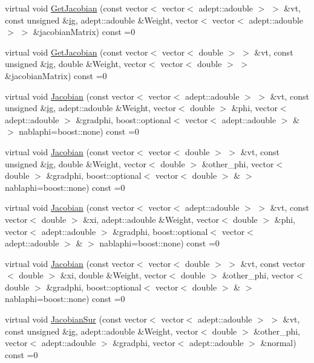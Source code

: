 \begin{DoxyCompactItemize}
\item 
virtual void \mbox{\hyperlink{classfemus_1_1elem__type_aa8e617c54dd774ffca5d305605552af7}{Get\+Jacobian}} (const vector$<$ vector$<$ adept\+::adouble $>$ $>$ \&vt, const unsigned \&\mbox{\hyperlink{namespacefemus_a6df31099f676311de214a312d7043941}{ig}}, adept\+::adouble \&Weight, vector$<$ vector$<$ adept\+::adouble $>$ $>$ \&jacobian\+Matrix) const =0
\item 
virtual void \mbox{\hyperlink{classfemus_1_1elem__type_a6c883b7946e55db8783fd0177546610a}{Get\+Jacobian}} (const vector$<$ vector$<$ double $>$ $>$ \&vt, const unsigned \&\mbox{\hyperlink{namespacefemus_a6df31099f676311de214a312d7043941}{ig}}, double \&Weight, vector$<$ vector$<$ double $>$ $>$ \&jacobian\+Matrix) const =0
\item 
virtual void \mbox{\hyperlink{classfemus_1_1elem__type_a937b1d5ecbeed3b17db831264a3492fa}{Jacobian}} (const vector$<$ vector$<$ adept\+::adouble $>$ $>$ \&vt, const unsigned \&\mbox{\hyperlink{namespacefemus_a6df31099f676311de214a312d7043941}{ig}}, adept\+::adouble \&Weight, vector$<$ double $>$ \&phi, vector$<$ adept\+::adouble $>$ \&gradphi, boost\+::optional$<$ vector$<$ adept\+::adouble $>$ \& $>$ nablaphi=boost\+::none) const =0
\item 
virtual void \mbox{\hyperlink{classfemus_1_1elem__type_ac3828ecd8ddd057d726a60cb19c60f0b}{Jacobian}} (const vector$<$ vector$<$ double $>$ $>$ \&vt, const unsigned \&\mbox{\hyperlink{namespacefemus_a6df31099f676311de214a312d7043941}{ig}}, double \&Weight, vector$<$ double $>$ \&other\+\_\+phi, vector$<$ double $>$ \&gradphi, boost\+::optional$<$ vector$<$ double $>$ \& $>$ nablaphi=boost\+::none) const =0
\item 
virtual void \mbox{\hyperlink{classfemus_1_1elem__type_a2d76133387cebf896c0e51459055fdea}{Jacobian}} (const vector$<$ vector$<$ adept\+::adouble $>$ $>$ \&vt, const vector$<$ double $>$ \&xi, adept\+::adouble \&Weight, vector$<$ double $>$ \&phi, vector$<$ adept\+::adouble $>$ \&gradphi, boost\+::optional$<$ vector$<$ adept\+::adouble $>$ \& $>$ nablaphi=boost\+::none) const =0
\item 
virtual void \mbox{\hyperlink{classfemus_1_1elem__type_aab6db5851a9810adfe0ff98df2c30810}{Jacobian}} (const vector$<$ vector$<$ double $>$ $>$ \&vt, const vector$<$ double $>$ \&xi, double \&Weight, vector$<$ double $>$ \&other\+\_\+phi, vector$<$ double $>$ \&gradphi, boost\+::optional$<$ vector$<$ double $>$ \& $>$ nablaphi=boost\+::none) const =0
\item 
virtual void \mbox{\hyperlink{classfemus_1_1elem__type_a293052fac0f51472150b1bf7365c6b18}{Jacobian\+Sur}} (const vector$<$ vector$<$ adept\+::adouble $>$ $>$ \&vt, const unsigned \&\mbox{\hyperlink{namespacefemus_a6df31099f676311de214a312d7043941}{ig}}, adept\+::adouble \&Weight, vector$<$ double $>$ \&other\+\_\+phi, vector$<$ adept\+::adouble $>$ \&gradphi, vector$<$ adept\+::adouble $>$ \&normal) const =0

\end{DoxyCompactItemize}
